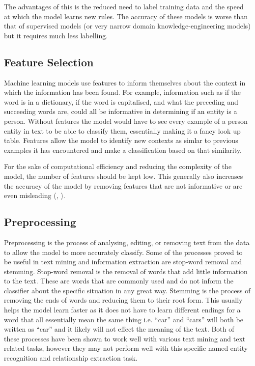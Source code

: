 \documentclass[11pt,oneside]{book}
\begin{document}
The advantages of this is the reduced need to label training data and the speed at which the model learns new rules. The accuracy of these models is worse than that of supervised models (or very narrow domain knowledge-engineering models) but it requires much less labelling.

\subsection{Feature Selection}

Machine learning models use features to inform themselves about the context in which the information has been found. For example, information such as if the word is in a dictionary, if the word is capitalised, and what the preceding and succeeding words are, could all be informative in determining if an entity is a person. Without features the model would have to see every example of a person entity in text to be able to classify them, essentially making it a fancy look up table. Features allow the model to identify new contexts as simlar to previous examples it has encountered and make a classification based on that similarity.

For the sake of computational efficiency and reducing the complexity of the model, the number of features should be kept low. This generally also increases the accuracy of the model by removing features that are not informative or are even misleading (\citet{feature_selection}, \citet{less_features_good}).

\subsection{Preprocessing}
Preprocessing is the process of analysing, editing, or removing text from the data to allow the model to more accurately classify. Some of the processes proved to be useful in text mining and information extraction \citep{preprocessing} are stop-word removal and stemming. Stop-word removal is the removal of words that add little information to the text. These are words that are commonly used and do not inform the classifier about the specific situation in any great way. Stemming is the process of removing the ends of words and reducing them to their root form. This usually helps the model learn faster as it does not have to learn different endings for a word that all essentially mean the same thing i.e. “car” and “cars” will both be written as “car” and it likely will not effect the meaning of the text. Both of these processes have been shown to work well with various text mining and text related tasks, however they may not perform well with this specific named entity recognition and relationship extraction task. 
\end{document}
